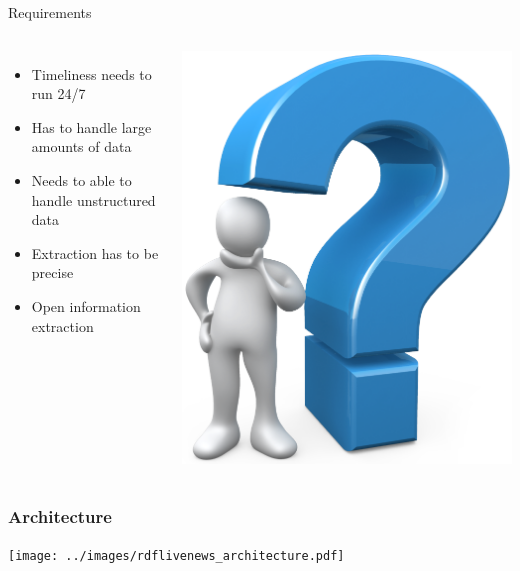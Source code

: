 \documentclass{beamer}
\begin{document}
\begin{frame}{Requirements}
\begin{columns}[c]
    \begin{itemize}
        \item Timeliness needs to run 24/7 
        \item Has to handle large amounts of data
        \item Needs to able to handle unstructured data
        \item Extraction has to be precise
        \item Open information extraction
    \end{itemize}
\includegraphics[width=\textwidth]{../images/question}
\end{columns}
\end{frame}


\begin{frame}
    \frametitle{Architecture}
        \texttt{[image: ../images/rdflivenews\_architecture.pdf]}
\end{frame}
\end{document}
